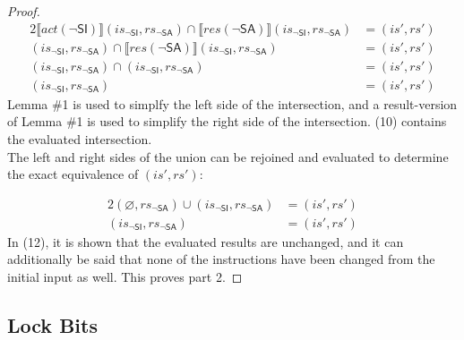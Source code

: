 \documentclass[12pt, letterpaper]{article}
\let\emptyset\varnothing
\newcommand\interp[1]{\llbracket #1 \rrbracket}
\begin{document}
\begin{proof}
{\begin{alignat}{2}
     \interp{ \mathit{act}(\neg\mathsf{SI}) } (\mathit{is_{\mathsf{\neg SI}}}, \mathit{rs_{\mathsf{\neg SA}}}) \cap
     \interp{ \mathit{res}(\neg\mathsf{SA}) } (\mathit{is_{\mathsf{\neg SI}}}, \mathit{rs_{\mathsf{\neg SA}}})
     &=
     (\mathit{is}', \mathit{rs}')
     \\
     (\mathit{is_{\mathsf{\neg SI}}}, \mathit{rs_{\mathsf{\neg SA}}}) \cap
     \interp{ \mathit{res}(\neg\mathsf{SA}) } (\mathit{is_{\mathsf{\neg SI}}}, \mathit{rs_{\mathsf{\neg SA}}})
     &=
     (\mathit{is}', \mathit{rs}')
     \\
     (\mathit{is_{\mathsf{\neg SI}}}, \mathit{rs_{\mathsf{\neg SA}}}) \cap
     (\mathit{is_{\mathsf{\neg SI}}}, \mathit{rs_{\mathsf{\neg SA}}})
     &=
     (\mathit{is}', \mathit{rs}')
     \\
     (\mathit{is_{\mathsf{\neg SI}}}, \mathit{rs_{\mathsf{\neg SA}}})
     &=
     (\mathit{is}', \mathit{rs}')
 \end{alignat}
 }%
     Lemma \#1 is used to simplfy the left side of the intersection, and a result-version of Lemma \#1 is used to simplify the right side of the intersection. (10) contains the evaluated intersection.\\
     The left and right sides of the union can be rejoined and evaluated to determine the exact equivalence of $(\mathit{is}', \mathit{rs}')$:
 \par\nobreak
 {\fontsize{10pt}{12pt}\selectfont
 \begin{alignat}{2}
     (\emptyset, \mathit{rs_{\mathsf{\neg SA}}}) \cup
     (\mathit{is_{\mathsf{\neg SI}}}, \mathit{rs_{\mathsf{\neg SA}}})
     &=
     (\mathit{is}', \mathit{rs}')
     \\
     (\mathit{is_{\mathsf{\neg SI}}}, \mathit{rs_{\mathsf{\neg SA}}})
     &=
     (\mathit{is}', \mathit{rs}')
 \end{alignat}
 }%
     In (12), it is shown that the evaluated results are unchanged, and it can additionally be said that none of the instructions have been changed from the initial input as well.  This proves part 2.
  \end{proof}


\subsection{Lock Bits}
\end{document}
